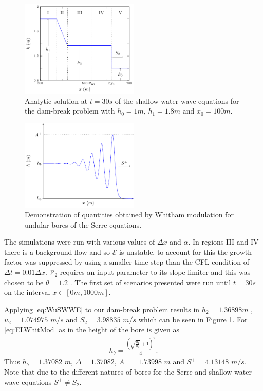 \documentclass[SingleSpace,12pt,Proceedings]{Serre_ASCE}
\begin{document}
\begin{figure}
\centering
\includegraphics[width=0.5\textwidth]{pics/explainers/SWWEana.pdf}
\caption{Analytic solution at $t=30s$ of the shallow water wave equations for the dam-break problem with $h_0 = 1m$, $h_1=1.8m$ and $x_0=100m$.}
\label{fig:SWWEanadiagram}
\end{figure}

\begin{figure}
\centering
\includegraphics[width=0.5\textwidth]{pics/explainers/SERREex.pdf}
\caption{Demonstration of quantities obtained by Whitham modulation for undular bores of the Serre equations.}
\label{fig:Serreanadiagram}
\end{figure}
The simulations were run with various values of $\Delta x$ and $\alpha$. In regions III and IV there is a background flow and so $\mathcal{E}$ is unstable, to account for this the growth factor was suppressed by using a smaller time step than the CFL condition of $\Delta t = 0.01 \Delta x$. $\mathcal{V}_2$ requires an input parameter to its slope limiter and this was chosen to be $\theta = 1.2$ \cite{Zoppou-etal-2017}. 
The first set of scenarios presented were run until $t=30s$ on the interval $x\in[0m,1000m]$.

Applying \eqref{eq:WuSWWE} to our dam-break problem results in $h_2 = 1.36898m$ , $u_2 = 1.074975$ $m/s$ and $S_2 = 3.98835$ $m/s$ which can be seen in Figure \ref{fig:SWWEanadiagram}. For \eqref{eq:ELWhitMod} as in  the height of the bore is given as
\begin{gather*}
\label{eqn:hrdef}
h_b = \frac{\left(\sqrt{\frac{h_1}{h_0}} + 1\right)^2}{4}.
\end{gather*} 
Thus $h_b = 1.37082$ $m$, $\Delta = 1.37082$,  $A^+ = 1.73998$ $m$ and $S^+ = 4.13148$ $m/s$.
Note that due to the different natures of bores for the Serre and shallow water wave equations $S^+ \neq S_2$.
\end{document}
